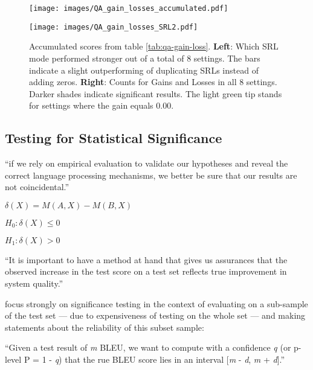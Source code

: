 \begin{figure}
  \begin{minipage}{0.45\linewidth}
  \vspace{0pt}
    \texttt{[image: images/QA\_gain\_losses\_accumulated.pdf]}
  \end{minipage}
  \hfill
  \begin{minipage}{0.45\linewidth}
  \vspace{0pt}
    \texttt{[image: images/QA\_gain\_losses\_SRL2.pdf]}
  \end{minipage}
  \caption[Accumulated Gains and Losses.]{Accumulated scores from table \ref{tab:qa-gain-loss}. \textbf{Left}: Which SRL mode performed stronger out of a total of 8 settings. The bars indicate a slight outperforming of duplicating SRLs instead of adding zeros. \textbf{Right}: Counts for Gains and Losses in all 8 settings. Darker shades indicate significant results. The light green tip stands for settings where the gain equals 0.00.}
\end{figure}


\subsection{Testing for Statistical Significance}

``if we rely on empirical evaluation to validate our hypotheses and reveal the correct language processing mechanisms, we better be sure that our results are not coincidental.'' \citep{dror2018hitchhiker}


$\delta(X) = M(A, X) - M(B, X)$

$H_0:\delta(X) \leq 0$

$H_1:\delta(X) > 0$

``It is important to have a method at hand that gives us assurances that the
observed increase in the test score on a test set reflects true improvement in system
quality.'' \citep{koehn2004statistical}

\citet{koehn2004statistical} focus strongly on significance testing in the context of evaluating
on a sub-sample of the test set --- due to expensiveness of testing on the whole set ---
and making statements about the reliability of this subset sample:

``Given a test result of \emph{m} BLEU, we want to compute with a confidence \emph{q} (or
p-level P = 1 - \emph{q}) that the rue BLEU score lies in an interval [\emph{m} - \emph{d},
\emph{m} + \emph{d}].'' \citep{koehn2004statistical}

